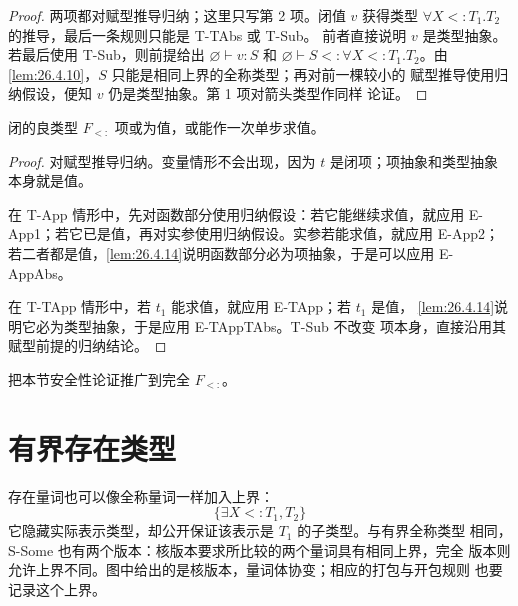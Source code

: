 \begin{proof}
两项都对赋型推导归纳；这里只写第 2 项。闭值 \(v\) 获得类型
\(\forall X<:T_1.T_2\) 的推导，最后一条规则只能是 T-TAbs 或 T-Sub。
前者直接说明 \(v\) 是类型抽象。若最后使用 T-Sub，则前提给出
\(\varnothing\vdash v:S\) 和
\(\varnothing\vdash S<:\forall X<:T_1.T_2\)。由
\cref{lem:26.4.10}，\(S\) 只能是相同上界的全称类型；再对前一棵较小的
赋型推导使用归纳假设，便知 \(v\) 仍是类型抽象。第 1 项对箭头类型作同样
论证。
\end{proof}

\begin{theorem}[进展性]
\label{thm:26.4.15}
闭的良类型 \(F_{<:}\) 项或为值，或能作一次单步求值。
\end{theorem}

\begin{proof}
对赋型推导归纳。变量情形不会出现，因为 \(t\) 是闭项；项抽象和类型抽象
本身就是值。

在 T-App 情形中，先对函数部分使用归纳假设：若它能继续求值，就应用
E-App1；若它已是值，再对实参使用归纳假设。实参若能求值，就应用 E-App2；
若二者都是值，\cref{lem:26.4.14}说明函数部分必为项抽象，于是可以应用
E-AppAbs。

在 T-TApp 情形中，若 \(t_1\) 能求值，就应用 E-TApp；若 \(t_1\) 是值，
\cref{lem:26.4.14}说明它必为类型抽象，于是应用 E-TAppTAbs。T-Sub 不改变
项本身，直接沿用其赋型前提的归纳结论。
\end{proof}

\begin{exercise}[\(\star\star\star\)]
\label{ex:26.4.16}
把本节安全性论证推广到完全 \(F_{<:}\)。
\end{exercise}

\section{有界存在类型}
\label{sec:26.5}

存在量词也可以像全称量词一样加入上界：
\[
\{\exists X<:T_1,T_2\}
\]
它隐藏实际表示类型，却公开保证该表示是 \(T_1\) 的子类型。与有界全称类型
相同，S-Some 也有两个版本：核版本要求所比较的两个量词具有相同上界，完全
版本则允许上界不同。图中给出的是核版本，量词体协变；相应的打包与开包规则
也要记录这个上界。

